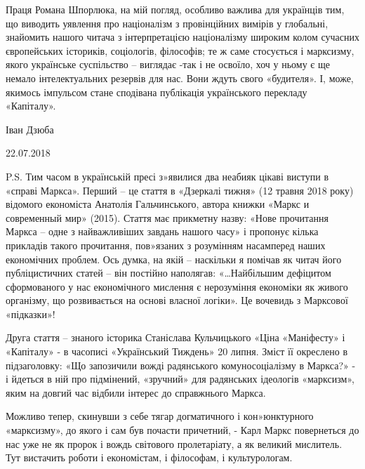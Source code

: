 \documentclass{kapital}
\begin{document}
	Праця Романа Шпорлюка, на мій погляд, особливо важлива для українців тим, що виводить уявлення про  націоналізм з провінційних вимірів у глобальні, знайомить нашого читача з інтерпретацією націоналізму широким колом сучасних європейських істориків, соціологів, філософів; те ж саме стосується і марксизму, якого українське суспільство – виглядає -так і не освоїло, хоч у ньому є ще немало інтелектуальних резервів для нас. Вони ждуть свого «будителя». І, може, якимось імпульсом стане сподівана публікація українського перекладу «Капіталу». 

\begin{flushright}
Іван Дзюба
\end{flushright}

\begin{small}
 22.07.2018 
\end{small}

P.S. Тим часом  в українській пресі з»явилися два неабияк цікаві виступи в «справі Маркса». Перший – це стаття в «Дзеркалі тижня» (12 травня 2018 року) відомого економіста Анатолія Гальчинського, автора книжки «Маркс и современный мир» (2015). Стаття має прикметну назву: «Нове прочитання Маркса – одне з найважливіших завдань нашого часу» і пропонує кілька прикладів такого прочитання, пов»язаних з розумінням насамперед наших економічних проблем. Ось думка, на якій – наскільки я помічав як читач його  публіцистичних статей – він постійно наполягав: «…Найбільшим дефіцитом сформованого у нас економічного мислення є нерозуміння економіки як живого організму, що розвивається на основі власної логіки». Це вочевидь з Марксової «підказки»!
 
	Друга стаття – знаного історика Станіслава Кульчицького «Ціна «Маніфесту» і «Капіталу» - в часописі «Український Тиждень»  20 липня. Зміст її окреслено в підзаголовку: «Що запозичили вожді радянського комуносоціалізму в Маркса?» - і йдеться в ній про підмінений, «зручний» для радянських ідеологів «марксизм», яким на довгий час відбили інтерес до справжнього Маркса. 
 
	Можливо тепер, скинувши з себе тягар догматичного і кон»юнктурного «марксизму», до якого і сам був почасти причетний, - Карл Маркс повернеться до нас уже не як пророк і вождь світового пролетаріату, а як великий мислитель.  Тут вистачить роботи і економістам, і філософам, і культурологам.
 
							
\end{document}
